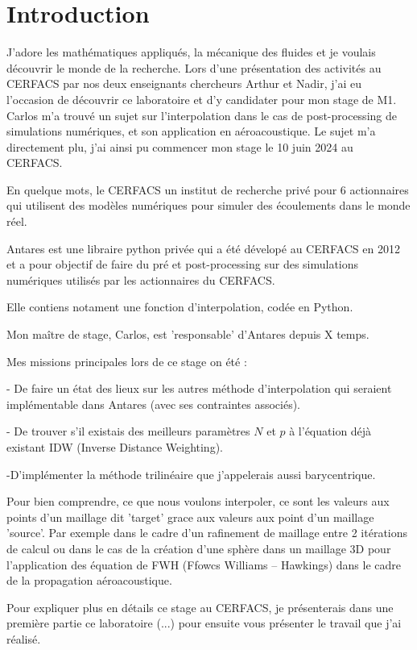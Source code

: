 \section*{Introduction}

J'adore les mathématiques appliqués, la mécanique des fluides et je voulais découvrir le monde de la recherche. Lors d'une présentation des activités au CERFACS par nos deux enseignants chercheurs Arthur et Nadir, j'ai eu l'occasion de découvrir ce laboratoire et d'y candidater pour mon stage de M1. Carlos m'a trouvé un sujet sur l'interpolation dans le cas de post-processing de simulations numériques, et son application en aéroacoustique. Le sujet m'a directement plu, j'ai ainsi pu commencer mon stage le 10 juin 2024 au CERFACS.

En quelque mots, le CERFACS un institut de recherche privé pour 6 actionnaires qui utilisent des modèles numériques pour simuler des écoulements dans le monde réel.

Antares est une libraire python privée qui a été dévelopé au CERFACS en 2012 et a pour objectif de faire du pré et post-processing sur des simulations numériques utilisés par les actionnaires du CERFACS.

Elle contiens notament une fonction d'interpolation, codée en Python.

Mon maître de stage, Carlos, est 'responsable' d'Antares depuis X temps. 

Mes missions principales lors de ce stage on été :

- De faire un état des lieux sur les autres méthode d'interpolation qui seraient 
implémentable dans Antares (avec ses contraintes associés).

- De trouver s'il existais des meilleurs paramètres \( N \) et \( p \) à l'équation déjà existant IDW (Inverse Distance Weighting).

 -D'implémenter la méthode trilinéaire que j'appelerais aussi barycentrique.

 Pour bien comprendre, ce que nous voulons interpoler, ce sont les valeurs aux points d'un maillage dit 'target' grace aux valeurs aux point d'un maillage 'source'. Par exemple dans le cadre d'un rafinement de maillage entre 2 itérations de calcul ou dans le cas de la création d'une sphère dans un maillage 3D pour l'application des équation de FWH (Ffowcs Williams – Hawkings) dans le cadre de la propagation aéroacoustique.

 Pour expliquer plus en détails ce stage au CERFACS, je présenterais dans une première partie ce laboratoire (...) pour ensuite vous présenter le travail que j'ai réalisé.
